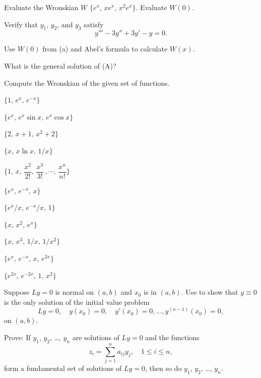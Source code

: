 \begin{exerciselist}
\item\label{exer:9.1.9}\begin{alist}
\item %
Evaluate the Wronskian $W$ $\{e^x,\,xe^x,\,
x^2e^x\}$. Evaluate $W(0)$.

\item %
Verify that $y_1$, $y_2$, and $y_3$ satisfy
\[
y'''-3y''+3y'-y=0.
\tag{A}
\]

\item %
Use $W(0)$ from (a) and Abel's formula to calculate $W(x)$.

\item %
What is the general solution of  (A)?
\end{alist}

\item\label{exer:9.1.10}Compute the Wronskian of the given set of functions.

\begin{alist*}[columns=2]
\item $\{1,\,e^x,\,e^{-x}\}$
\item $\{e^x,\, e^x\sin x,\,e^x\cos x\}$
\item $\{2,\,x+1,\,x^2+2\}$
\item $\{x,\,x\ln x,\,1/x\}$
\item $\{1,\,x,\,\dfrac{x^2}{2!},\,\dfrac{x^3}{3!}\,,\cdots,\,\dfrac{x^n}{n!}\}$
\item $\{e^x,\,e^{-x},\,x\}$
\item $\{e^x/x,\,e^{-x}/x,\,1\}$
\item $\{x,\,x^2,\,e^x\}$
\item $\{x,\,x^3,\,1/x,\,1/x^2\}$
\item $\{e^x,\,e^{-x},\,x,\,e^{2x}\}$
\item $\{e^{2x},\,e^{-2x},\,1,\,x^2\}$
\end{alist*}

\item\label{exer:9.1.11}Suppose $Ly=0$ is normal on $(a,b)$ and $x_0$ is in $(a,b)$. Use
 to show that $y\equiv0$ is the only solution
of the initial value problem
\[
Ly=0, \quad  y(x_0)=0,\quad y'(x_0)=0,\dots, y^{(n-1)}(x_0)=0,
\]
on $(a,b)$.

\item\label{exer:9.1.12}Prove:  If $y_1$, $y_2$, \dots, $y_n$ are solutions of $Ly=0$ and the
functions
\[
z_i=\sum^n_{j=1}a_{ij}y_j,\quad 1\le i\le n,
\]
form a fundamental set of solutions of $Ly=0$, then so do $y_1$, $y_2$,
\dots, $y_n$.


\end{exerciselist}
